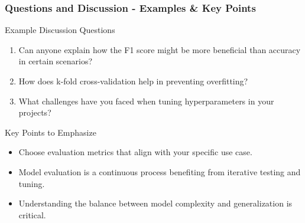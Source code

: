 \documentclass[aspectratio=169]{beamer}
\begin{document}
\begin{frame}[fragile]
  \frametitle{Questions and Discussion - Examples & Key Points}
  \begin{block}{Example Discussion Questions}
    \begin{enumerate}
      \item Can anyone explain how the F1 score might be more beneficial than accuracy in certain scenarios?
      \item How does k-fold cross-validation help in preventing overfitting?
      \item What challenges have you faced when tuning hyperparameters in your projects?
    \end{enumerate}
  \end{block}

  \begin{block}{Key Points to Emphasize}
    \begin{itemize}
      \item Choose evaluation metrics that align with your specific use case.
      \item Model evaluation is a continuous process benefiting from iterative testing and tuning.
      \item Understanding the balance between model complexity and generalization is critical.
    \end{itemize}
  \end{block}
\end{frame}
\end{document}
